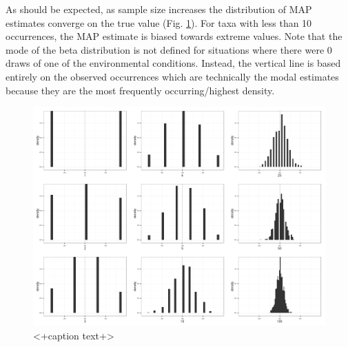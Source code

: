 \documentclass[12pt,letterpaper]{article}
\begin{document}
As should be expected, as sample size increases the distribution of MAP estimates converge on the true value (Fig. \ref{fig:env_mode}). For taxa with less than 10 occurrences, the MAP estimate is biased towards extreme values. Note that the mode of the beta distribution is not defined for situations where there were 0 draws of one of the environmental conditions. Instead, the vertical line is based entirely on the observed occurrences which are technically the modal estimates because they are the most frequently occurring/highest density.
\begin{figure}[ht]
  \centering
  \includegraphics[height = \textheight,width=\textwidth,keepaspectratio=true]{figure/env_mode_dist}
  \caption{<+caption text+>}
  \label{fig:env_mode}
\end{figure}
\end{document}
